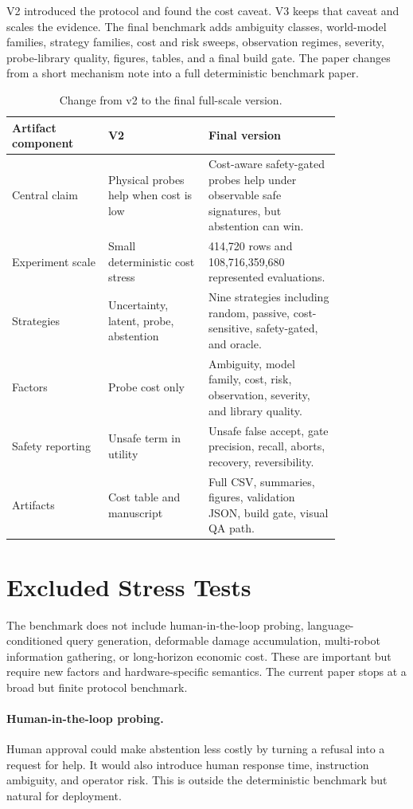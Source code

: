 \documentclass{article}
\begin{document}
V2 introduced the protocol and found the cost caveat. V3 keeps that caveat and scales the evidence. The final benchmark adds ambiguity classes, world-model families, strategy families, cost and risk sweeps, observation regimes, severity, probe-library quality, figures, tables, and a final build gate. The paper changes from a short mechanism note into a full deterministic benchmark paper.

\begin{table}[H]
\centering
\small
\begin{tabular}{p{0.24\linewidth}p{0.25\linewidth}p{0.33\linewidth}}
\toprule
Artifact component & V2 & Final version \\
\midrule
Central claim & Physical probes help when cost is low & Cost-aware safety-gated probes help under observable safe signatures, but abstention can win. \\
Experiment scale & Small deterministic cost stress & 414,720 rows and 108,716,359,680 represented evaluations. \\
Strategies & Uncertainty, latent, probe, abstention & Nine strategies including random, passive, cost-sensitive, safety-gated, and oracle. \\
Factors & Probe cost only & Ambiguity, model family, cost, risk, observation, severity, and library quality. \\
Safety reporting & Unsafe term in utility & Unsafe false accept, gate precision, recall, aborts, recovery, reversibility. \\
Artifacts & Cost table and manuscript & Full CSV, summaries, figures, validation JSON, build gate, visual QA path. \\
\bottomrule
\end{tabular}
\caption{Change from v2 to the final full-scale version.}
\label{tab:v2_to_final}
\end{table}

\section{Excluded Stress Tests}

The benchmark does not include human-in-the-loop probing, language-conditioned query generation, deformable damage accumulation, multi-robot information gathering, or long-horizon economic cost. These are important but require new factors and hardware-specific semantics. The current paper stops at a broad but finite protocol benchmark.

\paragraph{Human-in-the-loop probing.}
Human approval could make abstention less costly by turning a refusal into a request for help. It would also introduce human response time, instruction ambiguity, and operator risk. This is outside the deterministic benchmark but natural for deployment.
\end{document}
